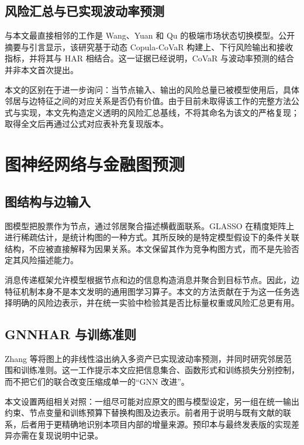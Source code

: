 \subsection{风险汇总与已实现波动率预测}
与本文最直接相邻的工作是 Wang、Yuan 和 Qu 的极端市场状态切换模型。公开摘要与引言显示，该研究基于动态 Copula-CoVaR 构建上、下行风险输出和接收指标，并将其与 HAR 相结合\cite{wang2026}。这一证据已经说明，CoVaR 与波动率预测的结合并非本文首次提出。

本文的区别在于进一步询问：当节点输入、输出的风险总量已被模型使用后，具体邻居与边特征之间的对应关系是否仍有价值。由于目前未取得该工作的完整方法公式与实现，本文先构造定义透明的风险汇总基线，不将其命名为该文的严格复现；取得全文后再通过公式对应表补充复现版本。

\section{图神经网络与金融图预测}
\subsection{图结构与边输入}
图模型把股票作为节点，通过邻居聚合描述横截面联系。GLASSO 在精度矩阵上进行稀疏估计，是统计构图的一种方式\cite{friedman2008}。其所反映的是特定模型假设下的条件关联结构，不应被直接解释为因果关系。本文保留其作为竞争构图方式，而不是先验否定其风险描述能力。

消息传递框架允许模型根据节点和边的信息构造消息并聚合到目标节点\cite{gilmer2017}。因此，边特征机制本身不是本文发明的通用图学习算子。本文的方法贡献在于为这一任务选择明确的风险边表示，并在统一实验中检验其是否比标量权重或风险汇总更有用。

\subsection{GNNHAR 与训练准则}
Zhang 等将图上的非线性溢出纳入多资产已实现波动率预测，并同时研究邻居范围和训练准则\cite{zhang2025}。这一工作提示本文应把信息集合、函数形式和训练损失分别控制，而不把它们的联合改变压缩成单一的“GNN 改进”。

本文设置两组相关对照：一组尽可能对应原文的图与模型设定，另一组在统一输出约束、节点变量和训练预算下替换构图及边表示。前者用于说明与既有文献的联系，后者用于更精确地识别本项目内部的增量来源。预印本与最终发表版的实现差异亦需在复现说明中记录。

